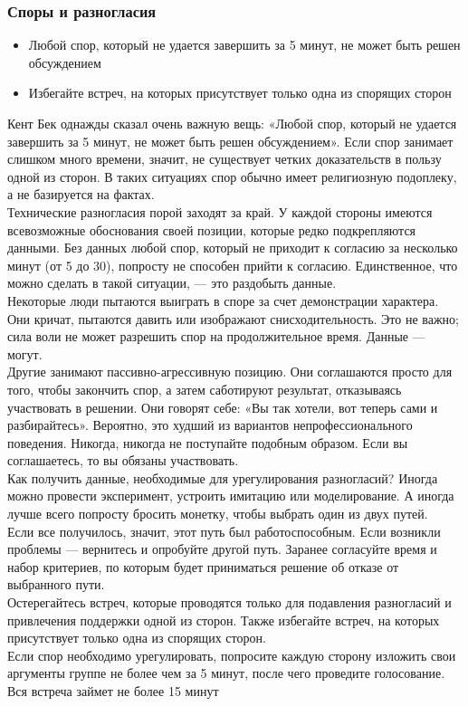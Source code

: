 \documentclass{../industrial-development}
\begin{document}
\begin{frame} \frametitle{Споры и разногласия}
\begin{itemize}
  \item Любой спор, который не удается завершить за 5 минут, не может быть решен обсуждением
  \item Избегайте встреч, на которых присутствует только одна из спорящих сторон
\end{itemize}
\end{frame}
\lecturenotes
Кент Бек однажды сказал очень важную вещь: «Любой спор, который не удается завершить за 5 минут, не может быть решен обсуждением». Если спор занимает слишком много времени, значит, не существует четких доказательств в пользу одной из сторон. В таких ситуациях спор обычно имеет религиозную подоплеку, а не базируется на фактах.\\
Технические разногласия порой заходят за край. У каждой стороны имеются всевозможные обоснования своей позиции, которые редко подкрепляются данными. Без данных любой спор, который не приходит к согласию за несколько минут (от 5 до 30), попросту не способен прийти к согласию. Единственное, что можно сделать в такой ситуации, — это раздобыть данные.\\
Некоторые люди пытаются выиграть в споре за счет демонстрации характера. Они кричат, пытаются давить или изображают снисходительность. Это не важно; сила воли не может разрешить спор на продолжительное время. Данные — могут.\\
Другие занимают пассивно-агрессивную позицию. Они соглашаются просто для того, чтобы закончить спор, а затем саботируют результат, отказываясь участвовать в решении. Они говорят себе: «Вы так хотели, вот теперь сами и разбирайтесь». Вероятно, это худший из вариантов непрофессионального поведения. Никогда, никогда не поступайте подобным образом. Если вы соглашаетесь, то вы обязаны участвовать.\\
Как получить данные, необходимые для урегулирования разногласий? Иногда можно провести эксперимент, устроить имитацию или моделирование. А иногда лучше всего попросту бросить монетку, чтобы выбрать один из двух путей.\\
Если все получилось, значит, этот путь был работоспособным. Если возникли проблемы — вернитесь и опробуйте другой путь. Заранее согласуйте время и набор критериев, по которым будет приниматься
решение об отказе от выбранного пути.\\
Остерегайтесь встреч, которые проводятся только для подавления разногласий и привлечения поддержки одной из сторон. Также избегайте встреч, на которых присутствует только одна из спорящих сторон.\\
Если спор необходимо урегулировать, попросите каждую сторону изложить свои аргументы группе не более чем за 5 минут, после чего проведите голосование. Вся встреча займет не более 15 минут
\end{document}
